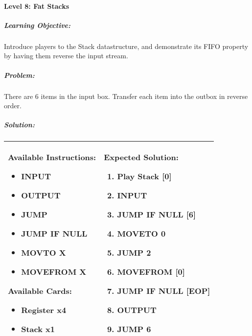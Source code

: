 \paragraph{Level 8: Fat Stacks}
\subparagraph{Learning Objective:} Introduce players to the Stack datastructure, and demonstrate its FIFO property by having them reverse the input stream.

\subparagraph{Problem:} There are 6 items in the input box. Transfer each item into the outbox in reverse order.

\subparagraph{Solution:} 
\begin{center}
    \begin{tabular}{ | m{5cm} | m{9cm} | } 
        \hline
            \textbf{Available Instructions:} 
            \begin{itemize}
                \item INPUT
                \item OUTPUT
                \item JUMP
                \item JUMP IF NULL
                \item MOVTO X
                \item MOVEFROM X
            \end{itemize}
            \textbf{Available Cards:} 
            \begin{itemize}
                \item Register x4
                \item Stack x1
            \end{itemize}& 
            \textbf{Expected Solution:} 
            \begin{enumerate}
                \item Play Stack [0]
                \item INPUT
                \item JUMP IF NULL [6]
                \item MOVETO 0
                \item JUMP 2
                \item MOVEFROM [0]
                \item JUMP IF NULL [EOP]
                \item OUTPUT
                \item JUMP 6
            \end{enumerate}
            \\
        \hline
    \end{tabular}
\end{center}


